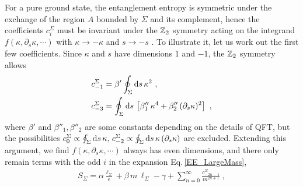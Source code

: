 For a pure ground state, the entanglement entropy is symmetric under the exchange of 
the region $A$ bounded by $\Sigma$ and its complement, hence the coefficients $c_{i}^\Sigma$ must be invariant under the $\mathbb{Z}_2$ symmetry acting on the integrand $f(\kappa, \partial_s \kappa, \cdots)$ with $\kappa\to -\kappa$ and $s\to -s$ \cite{Grover:2011fa}.
To illustrate it, let us work out the first few coefficients.
Since $\kappa$ and $s$ have dimensions $1$ and $-1$, the $\mathbb{Z}_2$ symmetry allows
\begin{align}
	\begin{aligned}
		c_{-1}^\Sigma &=  \beta' \oint_\Sigma \mathrm{d} s \,\kappa^2 \ , \\
		c_{-3}^\Sigma &=  \oint_\Sigma \mathrm{d} s \, \left[\beta''_1\, \kappa^4 + \beta''_2\,(\partial_s\kappa)^2\right] \ ,
	\end{aligned}
\end{align}
where $\beta'$ and $\beta''_1, \beta''_2$ are some constants depending on the details of QFT, but the possibilities $c_0^\Sigma \propto \oint_\Sigma \mathrm{d} s\,\kappa, \, c_{-2}^\Sigma \propto \oint_\Sigma \mathrm{d} s\,\kappa\, (\partial_s\kappa)$ are excluded.
Extending this argument, we find $f(\kappa, \partial_s \kappa, \cdots)$ always has even dimensions, and there only remain terms with the odd $i$ in the expansion Eq.\,\eqref{EE_LargeMass},
\begin{align}\label{EE_MassScalar}
S_\Sigma = \alpha \frac{\ell_\Sigma}{\epsilon} + \beta\, m\, \ell_\Sigma - \gamma + \sum_{n=0}^\infty \frac{c_{-2n-1}^\Sigma}{m^{2n+1}} \ ,
\end{align}


